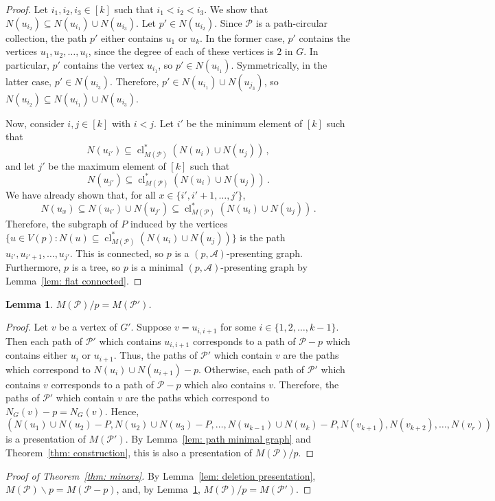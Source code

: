 \documentclass[11pt, reqno]{amsart}
\newtheorem{lemma}[theorem]{Lemma}
\DeclareMathOperator{\cl}{cl}
\begin{document}
\begin{proof}
Let $i_1, i_2, i_3 \in [k]$ such that $i_1 < i_2 < i_3$. We show that $N(u_{i_2}) \subseteq N(u_{i_1}) \cup N(u_{i_3})$. Let $p' \in N(u_{i_2})$. Since $\mathcal P$ is a path-circular collection, the path $p'$ either contains $u_1$ or $u_k$. In the former case, $p'$ contains the vertices $u_1,u_2,\ldots,u_i$, since the degree of each of these vertices is $2$ in $G$. In particular, $p'$ contains the vertex $u_{i_1}$, so $p' \in N(u_{i_1})$. Symmetrically, in the latter case, $p' \in N(u_{i_3})$. Therefore, $p' \in N(u_{i_1}) \cup N(u_{j_3})$, so $N(u_{i_2}) \subseteq N(u_{i_1}) \cup N(u_{i_3})$.

Now, consider $i, j \in [k]$ with $i < j$. Let $i'$ be the minimum element of $[k]$ such that 
$$
N(u_{i'}) \subseteq \cl^*_{M(\mathcal P)}(N(u_i) \cup N(u_j)) \,,
$$ 
and let $j'$ be the maximum element of $[k]$ such that 
$$
N(u_{j'}) \subseteq \cl^*_{M(\mathcal P)}(N(u_i) \cup N(u_j)) \,.
$$ 
We have already shown that, for all $x \in \{i',i'+1,\ldots,j'\}$,
$$
N(u_x) \subseteq N(u_{i'}) \cup N(u_{j'}) \subseteq \cl^*_{M(\mathcal P)}(N(u_i) \cup N(u_j)) \,.
$$
Therefore, the subgraph of $P$ induced by the vertices $\{u \in V(p) : N(u) \subseteq \cl^*_{M(\mathcal P)}(N(u_i) \cup N(u_j))\}$ is the path $u_{i'},u_{i'+1},\ldots,u_{j'}$. This is connected, so $p$ is a $(p, \mathcal A)$-presenting graph. Furthermore, $p$ is a tree, so $p$ is a minimal $(p, \mathcal A)$-presenting graph by Lemma~\ref{lem: flat connected}.
\end{proof}

\begin{lemma} \label{lem: contraction}
$M(\mathcal P) / p = M(\mathcal P')$.	
\end{lemma}

\begin{proof}
Let $v$ be a vertex of $G'$. Suppose $v = u_{i,i+1}$ for some $i \in \{1,2,\ldots,k-1\}$. Then each path of $\mathcal P'$ which contains $u_{i,i+1}$ corresponds to a path of $\mathcal P - p$ which contains either $u_i$ or $u_{i+1}$. Thus, the paths of $\mathcal P'$ which contain $v$ are the paths which correspond to $N(u_i) \cup N(u_{i+1}) - p$. Otherwise, each path of $\mathcal P'$ which contains $v$ corresponds to a path of $\mathcal P - p$ which also contains $v$. Therefore, the paths of $\mathcal P'$ which contain $v$ are the paths which correspond to $N_G(v) - p = N_G(v)$. Hence,
$$
(N(u_1) \cup N(u_2) - P, N(u_2) \cup N(u_3) - P, \ldots, N(u_{k-1}) \cup N(u_k) - P, N(v_{k+1}), N(v_{k+2}), \ldots, N(v_r))
$$
is a presentation of $M(\mathcal P')$. By Lemma~\ref{lem: path minimal graph} and Theorem~\ref{thm: construction}, this is also a presentation of $M(\mathcal P) / p$.
\end{proof}
	
	
\begin{proof}[Proof of Theorem~\ref{thm: minors}]
By Lemma~\ref{lem: deletion presentation}, $M(\mathcal P) \backslash p = M(\mathcal P - p)$, and, by Lemma~\ref{lem: contraction}, $M(\mathcal P) / p = M(\mathcal P')$.
\end{proof}

\printbibliography
\end{document}
